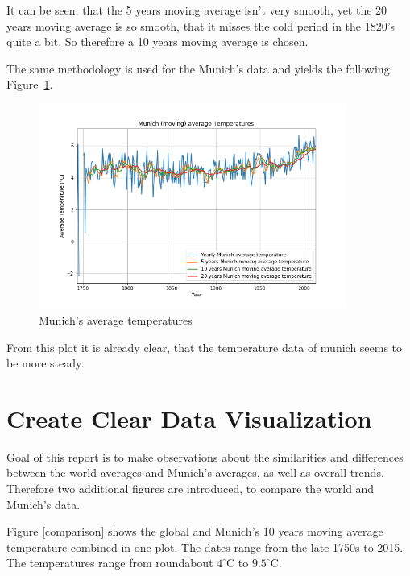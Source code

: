 \documentclass[DIV=11, a4paper, parskip=true]{scrartcl}
\begin{document}
It can be seen, that the 5 years moving average isn't very smooth, yet the 20 years moving
average is so smooth, that it misses the cold period in the 1820's quite a bit. So therefore a
10 years moving average is chosen.

The same methodology is used for the Munich's data and yields the following
Figure~\ref{munich_averages}.

\begin{figure}[H]
    \centering
    \includegraphics[width=0.9\textwidth]{munich_average_temperatures.png}
    \caption{Munich's average temperatures}
    \label{munich_averages}
\end{figure}

From this plot it is already clear, that the temperature data of munich seems to be more
steady.

\section{Create Clear Data Visualization}

Goal of this report is to make observations about the similarities and differences between the
world averages and Munich's averages, as well as overall trends. Therefore two additional
figures are introduced, to compare the world and Munich's data.

Figure \ref{comparison} shows the global and Munich's 10 years moving average temperature
combined in one plot. The dates range from the late 1750s to 2015. The temperatures range from
roundabout $4^\circ$C to $9.5^\circ$C.
\end{document}
